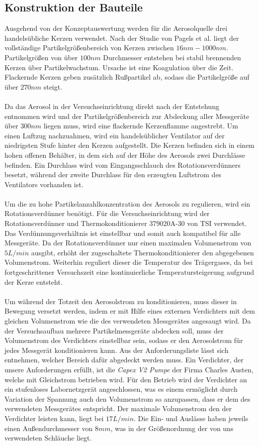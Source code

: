 \subsection{Konstruktion der Bauteile}
Ausgehend von der Konzeptauswertung werden für die Aerosolquelle drei handelsübliche Kerzen verwendet. Nach der Studie von Pagels et al.\cite{candle} liegt der vollständige Partikelgrößenbereich von Kerzen zwischen \(16nm - 1000nm\). Partikelgrößen von über \(100nm\) Durchmesser entstehen bei stabil brennenden Kerzen über Partikelwachstum. Ursache ist eine Koagulation über die Zeit. Flackernde Kerzen geben zusätzlich Rußpartikel ab, sodass die Partikelgröße auf über \(270nm\) steigt.
\\\\
Da das Aerosol in der Versuchseinrichtung direkt nach der Entstehung entnommen wird und der Partikelgrößenbereich zur Abdeckung aller Messgeräte über \(300nm\) liegen muss, wird eine flackernde Kerzenflamme angestrebt. Um einen Luftzug nachzuahmen, wird ein handelsüblicher Ventilator auf der niedrigsten Stufe hinter den Kerzen aufgestellt. Die Kerzen befinden sich in einem hohen offenen Behälter, in dem sich auf der Höhe des Aerosols zwei Durchlässe befinden. Ein Durchlass wird vom Eingangsschlauch des Rotationsverdünners besetzt, während der zweite Durchlass für den erzeugten Luftstrom des Ventilators vorhanden ist.
\\\\
Um die zu hohe Partikelanzahlkonzentration des Aerosols zu regulieren, wird ein Rotationsverdünner benötigt. Für die Versuchseinrichtung wird der Rotationsverdünner und Thermokonditionierer 379020A-30 von TSI verwendet. Das Verdünnungsverhältnis ist einstellbar und somit auch kompatibel für alle Messgeräte. Da der Rotationsverdünner nur einen maximalen Volumenstrom von \(5L/min\) ausgibt, erhöht der zugeschaltete Thermokonditionierer den abgegebenen Volumenstrom. Weiterhin reguliert dieser die Temperatur des Trägergases, da bei fortgeschrittener Versuchszeit eine kontinuierliche Temperatursteigerung aufgrund der Kerze entsteht.
\\\\
Um während der Totzeit den Aerosolstrom zu konditionieren, muss dieser in Bewegung versetzt werden, indem er mit Hilfe eines externen Verdichters mit dem gleichen Volumenstrom wie die des verwendeten Messgerätes angesaugt wird. Da der Versuchsaufbau mehrere Partikelmessgeräte abdecken soll, muss der Volumenstrom des Verdichters einstellbar sein, sodass er den Aerosolstrom für jedes Messgerät konditionieren kann. Aus der Anforderungsliste lässt sich entnehmen, welcher Bereich dafür abgedeckt werden muss. Ein Verdichter, der unsere Anforderungen erfüllt, ist die \textit{Capex V2 Pumpe} der Firma Charles Austen, welche mit Gleichstrom betrieben wird. Für den Betrieb wird der Verdichter an ein stufenloses Labornetzgerät angeschlossen, was es einem ermöglicht durch Variation der Spannung auch den Volumenstrom so anzupassen, dass er dem des verwendeten Messgerätes entspricht. Der maximale Volumenstrom den der Verdichter leisten kann, liegt bei \(17 L/min\). Die Ein- und Auslässe haben jeweils einen Außendurchmesser von \(8mm\), was in der Größenordnung der von uns verwendeten Schläuche liegt.
